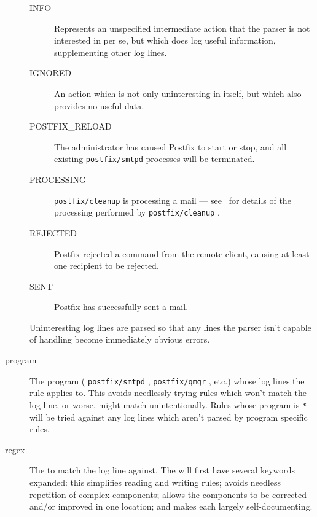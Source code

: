 \documentclass[a4paper,12pt,draft]{article}
\newcommand{\daemon}[1]{%
    \texttt{postfix/#1}%
}
\begin{document}
\begin{description}
\begin{description}
            \item [INFO] Represents an unspecified intermediate action that
                the parser is not interested in per se, but which does log
                useful information, supplementing other log lines.

            \item [IGNORED] An action which is not only uninteresting in
                itself, but which also provides no useful data.

            \item [POSTFIX\_RELOAD] The administrator has caused Postfix to
                start or stop, and all existing \daemon{smtpd} processes
                will be terminated.

            \item [PROCESSING] \daemon{cleanup} is processing a mail ---
                see~\cite{postfix-cleanup} for details of the processing
                performed by \daemon{cleanup}.

            \item [REJECTED] Postfix rejected a command from the remote
                client, causing at least one recipient to be rejected.

            \item [SENT] Postfix has successfully sent a mail.

        \end{description}

        Uninteresting log lines are parsed so that any lines the parser
        isn't capable of handling become immediately obvious errors.

    \item [program] The program (\daemon{smtpd}, \daemon{qmgr}, etc.) whose
        log lines the rule applies to.  This avoids needlessly trying rules
        which won't match the log line, or worse, might match
        unintentionally.  Rules whose program is \texttt{*} will be tried
        against any log lines which aren't parsed by program specific
        rules.

    \item [regex] The \regex{} to match the log line against.  The \regex{}
        will first have several keywords expanded: this simplifies reading
        and writing rules; avoids needless repetition of complex \regex{}
        components; allows the components to be corrected and/or improved
        in one location; and makes each \regex{} largely self-documenting.


\end{description}
\end{document}
